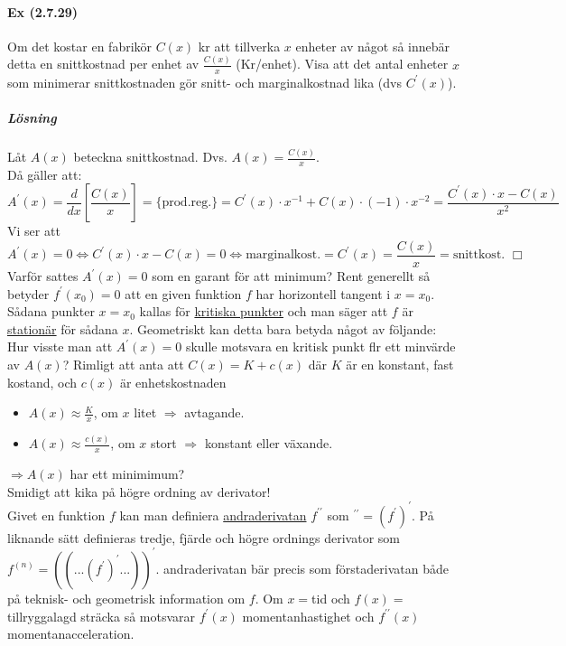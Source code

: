 \paragraph{Ex (2.7.29)} Om det kostar en fabrikör $C(x)$ kr att tillverka $x$ enheter av något så innebär detta en snittkostnad per enhet av $\frac{C(x)}{x}$ (Kr/enhet).
Visa att det antal enheter $x$ som minimerar snittkostnaden gör snitt- och marginalkostnad lika (dvs $C^\prime(x)$).
\subparagraph{Lösning} Låt $A(x)$ beteckna snittkostnad. Dvs. $A(x)=\frac{C(x)}{x}$.\\
Då gäller att:
\begin{equation*}
    A^\prime(x)=\frac{d}{dx}[\frac{C(x)}{x}]=\{\text{prod.reg.}\}=C^\prime(x)\cdot x^{-1}+C(x)\cdot (-1)\cdot x^{-2}=\frac{C^\prime(x)\cdot x-C(x)}{x^2}
\end{equation*}
Vi ser att
\begin{equation*}
    A^\prime(x)=0\Leftrightarrow C^\prime(x)\cdot x-C(x)=0\Leftrightarrow\text{marginalkost.}=C^\prime(x)=\frac{C(x)}{x}=\text{snittkost. }\Box
\end{equation*}
Varför sattes $A^\prime(x)=0$ som en garant för att minimum?
Rent generellt så betyder $f^\prime(x_0)=0$ att en given funktion $f$ har horizontell tangent i $x=x_0$.
Sådana punkter $x=x_0$ kallas för \underline{kritiska punkter} och man säger att $f$ är \underline{stationär} för sådana $x$.
Geometriskt kan detta bara betyda något av följande:\\
Hur visste man att $A^\prime(x)=0$ skulle motsvara en kritisk punkt flr ett minvärde av $A(x)$?
Rimligt att anta att $C(x)=K+c(x)$ där $K$ är en konstant, fast kostand, och $c(x)$ är enhetskostnaden
\begin{itemize}
    \item $A(x)\approx \frac{K}{x}$, om $x$ litet $\Rightarrow$ avtagande.
    \item $A(x)\approx \frac{c(x)}{x}$, om $x$ stort $\Rightarrow$ konstant eller växande.
\end{itemize}
$\Rightarrow A(x)$ har ett minimimum?\\
Smidigt att kika på högre ordning av derivator!\\
Givet en funktion $f$ kan man definiera \underline{andraderivatan} $f^{\prime\prime}$ som $^{\prime\prime}=(f^\prime)^\prime$.
På liknande sätt definieras tredje, fjärde och högre ordnings derivator som $f^{(n)}=((...(f^\prime)^\prime...))^\prime$.
andraderivatan bär precis som förstaderivatan både på teknisk- och geometrisk information om $f$.
Om $x=$tid och $f(x)=$tillryggalagd sträcka så motsvarar $f^\prime(x)$ momentanhastighet och $f^{\prime\prime}(x)$ momentanacceleration.

